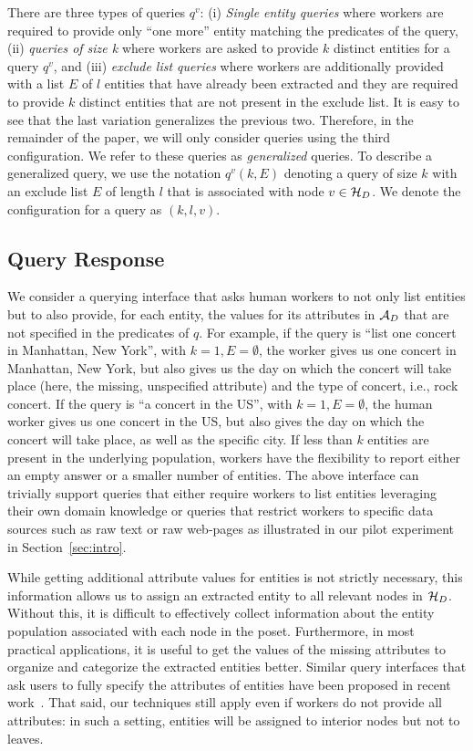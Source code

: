 There are three types of queries $q^v$: (i) {\em Single entity queries} where workers are required to provide only ``one more'' entity matching the predicates of the query, (ii) {\em queries of size k} where workers are asked to provide $k$ distinct entities for a query $q^v$, and (iii) {\em exclude list queries} where workers are additionally provided with a list $E$ of $l$ entities that have already been extracted and they are required to provide $k$ distinct entities that are not present in the exclude list. It is easy to see that the last variation generalizes the previous two. Therefore, in the remainder of the paper, we will only consider queries using the third configuration. We refer to these queries as {\em generalized} queries. To describe a generalized query, we use the notation $q^v(k,E)$ denoting a query of size $k$ with an exclude list $E$ of length $l$ that is associated with node $v \in \mathcal{H}_D$. We denote the configuration for a query as $(k,l,v)$.

\subsection{Query Response} 
We consider a querying interface that asks human workers to not only list entities but to also provide, for each entity, the values for its attributes in $\mathcal{A}_D$ that are not specified in the predicates of $q$. For example, if the query is ``list one concert in Manhattan, New York'', with $k = 1, E = \emptyset$, the worker gives us one concert in Manhattan, New York, but also gives us the day on which the concert will take place (here, the missing, unspecified attribute) and the type of concert, i.e., rock concert. If the query is ``a concert in the US'', with $k = 1, E = \emptyset$, the human worker gives us one concert in the US, but also gives the day on which the concert will take place, as well as the specific city. If less than $k$ entities are present in the underlying population, workers have the flexibility to report either an empty answer or a smaller number of entities. 
\iftr
The above interface can trivially support queries that either require workers to list entities leveraging their own domain knowledge or queries that restrict workers to specific data sources such as raw text or raw web-pages as illustrated in our pilot experiment in Section~\ref{sec:intro}.
\fi

While getting additional attribute values for entities is not strictly necessary, this information allows us to assign an extracted entity to all relevant nodes in $\mathcal{H}_D$. 
\iftr
Without this, it is difficult to effectively collect information about the entity population associated with each node in the poset. 
\fi
Furthermore, in most practical applications, it is useful to get the values of the missing attributes to organize and categorize the extracted entities better. Similar query interfaces that ask users to fully specify the attributes of entities have been proposed in recent work~\cite{quinn:2014}.  That said, our techniques still apply even if workers do not provide
all attributes: in such a setting, entities will be assigned to interior nodes but not to leaves.

